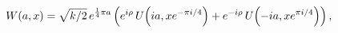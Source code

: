 \[\mathop{W\/}\nolimits\!\left(a,x\right)=\sqrt{k/2}\,e^{\frac{1}{4}\pi a}\left(%
e^{i\rho}\mathop{U\/}\nolimits\!\left(ia,xe^{-\pi i/4}\right)+e^{-i\rho}%
\mathop{U\/}\nolimits\!\left(-ia,xe^{\pi i/4}\right)\right),\]